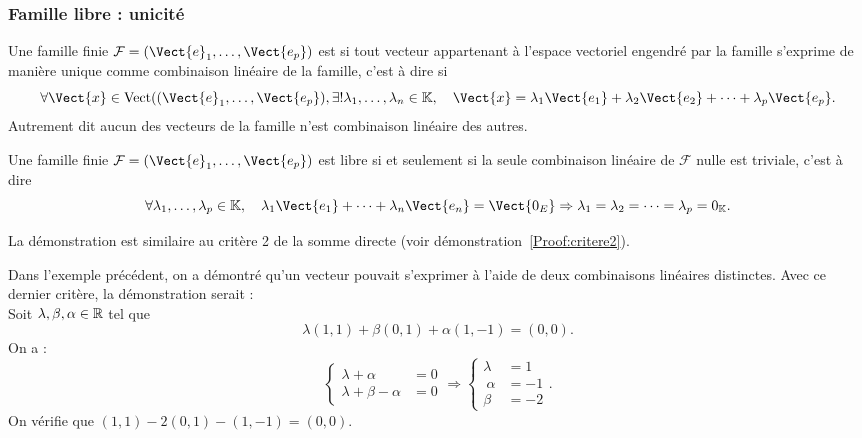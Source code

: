 \documentclass{book}
\begin{document}
\subsubsection{Famille libre : unicité}
\begin{Definition}
Une famille finie  $\mathcal{F}=(\Vect{e}_1,\dots,\Vect{e_p})$ est  si tout vecteur appartenant à l'espace vectoriel engendré par la famille s'exprime de manière unique comme combinaison linéaire de la famille, c'est à dire si 
\[ \forall \Vect{x} \in \Vectt((\Vect{e}_1,\dots,\Vect{e_p}),\exists ! \lambda_1,\dots,\lambda_n \in \K,\quad \Vect{x} = \lambda_1 \Vect{e_1}+ \lambda_2 \Vect{e_2}+\dots +\lambda_p \Vect{e_p}. \]
Autrement dit aucun des vecteurs de la famille n'est combinaison linéaire des autres.
\end{Definition}
\begin{Proposition}[Critère]
Une famille finie  $\mathcal{F}=(\Vect{e}_1,\dots,\Vect{e_p})$ est libre si et seulement si la seule combinaison linéaire de $\mathcal{F}$ nulle est triviale, c'est à dire
$$ \forall \lambda_1,\dots,\lambda_p   \in \K,\quad  \lambda _1 \Vect{e_1}+\dots+\lambda _n \Vect{e_n} = \Vect{0_E} \Rightarrow \lambda _1=\lambda _2=\dots=\lambda_p= 0_\K  .$$
\end{Proposition}
\begin{Demonstration}
La démonstration est similaire au critère 2 de la somme directe (voir démonstration~\ref{Proof:critere2}).
\end{Demonstration}
\begin{Exemple}
Dans l'exemple précédent, on a démontré qu'un vecteur pouvait s'exprimer à l'aide de deux combinaisons linéaires distinctes. Avec ce dernier critère, la démonstration serait :\\
Soit $\lambda,\beta,\alpha \in \mathbb{R}$ tel que $$\lambda (1,1) + \beta  (0,1) + \alpha (1,-1)    =(0,0).$$
On a : 
$$ \begin{cases}\lambda +\alpha &=0\\\lambda+\beta-\alpha&=0\end{cases}\Rightarrow \begin{cases}\lambda &=1\\\ \alpha&=-1\\ \beta&=-2 \end{cases}.$$
On vérifie que $(1,1)-2(0,1)- (1,-1) =(0,0)$.
\end{Exemple}
\end{document}
